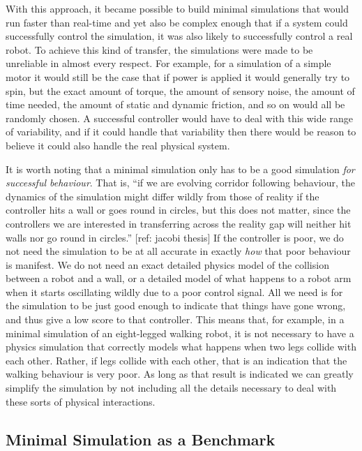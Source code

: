 \documentclass{frontiersSCNS} %
\begin{document}
With this approach, it became possible to build minimal simulations that would
run faster than real-time and yet also be complex enough that if a system
could successfully control the simulation, it was also likely to successfully
control a real robot.  To achieve this kind of transfer, the simulations were made to be
unreliable in almost every respect.  For example, for a simulation of a simple
motor it would still be the case that if power is applied it would generally
try to spin, but the exact amount of torque, the amount of sensory noise,
the amount of time needed, the amount of static and dynamic friction, and so
on would all be randomly chosen.  A successful controller would have to deal
with this wide range of variability, and if it could handle that variability
then there would be reason to believe it could also handle the real physical system.

It is worth noting that a minimal simulation only has to be a
good simulation \emph{for successful behaviour}.  That is, ``if we are evolving 
corridor following behaviour, the dynamics of the simulation might
differ wildly from those of reality if the controller hits a wall or
goes round in circles, but this does
not matter, since the controllers we are interested in transferring
across the reality gap will neither
hit walls nor go round in circles.''  [ref: jacobi thesis]  If the controller is poor, we do not 
need the simulation to be at all accurate in exactly \emph{how} that poor
behaviour is manifest.  We do not need an exact detailed physics model of
the collision between a robot and a wall, or a detailed model of what happens
to a robot arm when it starts oscillating wildly due to a poor control signal.
All we need is for the simulation to be just good enough to indicate that
things have gone wrong, and thus give a low score to that controller.  This
means that, for example, in a minimal simulation of an eight-legged walking robot,
it is not necessary to have a physics simulation that correctly models what
happens when two legs collide with each other.  Rather, if legs collide
with each other, that is an indication that the walking behaviour is very poor.
As long as that result is indicated we can greatly simplify the simulation
by not including all the details necessary to deal with these sorts of physical
interactions.

\subsection{Minimal Simulation as a Benchmark}
\end{document}
